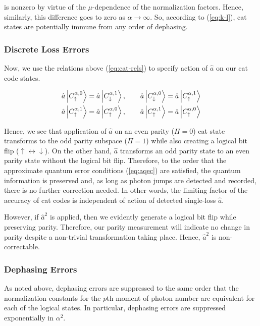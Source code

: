 \documentclass[12]{amsart}
\newcommand\0{\mathbf{0}}
\newcommand\<{\langle}
\renewcommand\>{\rangle}
\begin{document}
is nonzero by virtue of the $\mu$-dependence of the normalization factors. Hence, similarly, this difference goes to zero as $\alpha \rightarrow \infty$. So, according to (\ref{eq:k-l}), cat states are potentially immune from any order of dephasing.

\subsubsection{Discrete Loss Errors}

Now, we use the relations above (\ref{eq:cat-rels}) to specify action of $\hat{a}$ on our cat code states.

\begin{align*}
\hat{a}	\ket{C^{\alpha, 0}_{\uparrow}} &= \hat{a}	\ket{C^{\alpha, 1}_{\downarrow}}, \qquad
\hat{a}	\ket{C^{\alpha, 0}_{\downarrow}} = \hat{a}	\ket{C^{\alpha, 1}_{\uparrow}}\\
\hat{a}	\ket{C^{\alpha, 1}_{\uparrow}} &= \hat{a}	\ket{C^{\alpha, 0}_{\uparrow}},\qquad 
\hat{a}	\ket{C^{\alpha, 1}_{\uparrow}} = \hat{a}	\ket{C^{\alpha, 0}_{\uparrow}}
\end{align*}

Hence, we see that application of $\hat{a}$ on an even parity ($\Pi = 0$) cat state transforms to the odd parity subspace ($\Pi = 1$) while also creating a logical bit flip ($\uparrow \leftrightarrow \downarrow$). On the other hand, $\hat{a}$ transforms an odd parity state to an even parity state without the logical bit flip. Therefore, to the order that the approximate quantum error conditions (\ref{eq:aqec}) are satisfied, the quantum information is preserved and, as long as photon jumps are detected and recorded, there is no further correction needed. In other words, the limiting factor of the accuracy of cat codes is independent of action of detected single-loss $\hat{a}$.

However, if $\hat{a}^2$ is applied, then we evidently generate a logical bit flip while preserving parity. Therefore, our parity measurement will indicate no change in parity despite a non-trivial transformation taking place. Hence, $\hat{a}^2$ is non-correctable.

\subsubsection{Dephasing Errors}
\label{sec:cat-deph}

As noted above, dephasing errors are suppressed to the same order that the normalization constants for the $p$th moment of photon number are equivalent for each of the logical states. In particular, dephasing errors are suppressed exponentially in $\alpha^2$.
\end{document}
